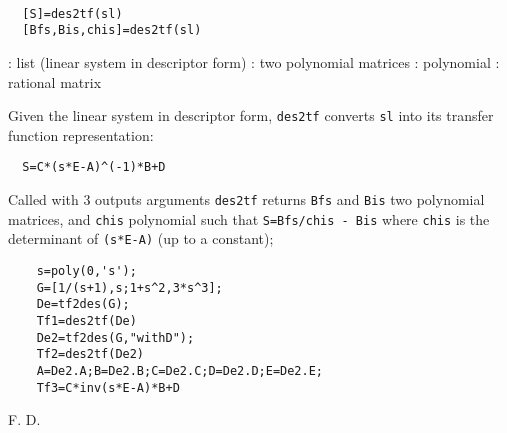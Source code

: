 \begin{mandesc}
   \\ %
\end{mandesc}
\begin{calling_sequence}
\begin{verbatim}
  [S]=des2tf(sl)  
  [Bfs,Bis,chis]=des2tf(sl)  
\end{verbatim}
\end{calling_sequence}
\begin{parameters}
  \begin{varlist}
    : list (linear system in descriptor form)
    : two polynomial matrices
    : polynomial
    : rational matrix
  \end{varlist}
\end{parameters}
\begin{mandescription}
  Given the linear system in descriptor form, 
  \verb!des2tf! converts \verb!sl! into
  its transfer function representation:
\begin{verbatim}
  S=C*(s*E-A)^(-1)*B+D
\end{verbatim}

  Called with 3 outputs arguments \verb!des2tf! returns
  \verb!Bfs! and \verb!Bis! two polynomial matrices, and \verb!chis!
  polynomial such that \verb!S=Bfs/chis - Bis!
  where \verb!chis! is the determinant of \verb!(s*E-A)! (up to a constant);
\end{mandescription}
\begin{examples}
  \begin{Verbatim}
    s=poly(0,'s');
    G=[1/(s+1),s;1+s^2,3*s^3];
    De=tf2des(G);
    Tf1=des2tf(De)
    De2=tf2des(G,"withD");
    Tf2=des2tf(De2)
    A=De2.A;B=De2.B;C=De2.C;D=De2.D;E=De2.E;
    Tf3=C*inv(s*E-A)*B+D
  \end{Verbatim}
\end{examples}
\begin{manseealso}
         
\end{manseealso}
\begin{authors}
  F. D.  
\end{authors}
